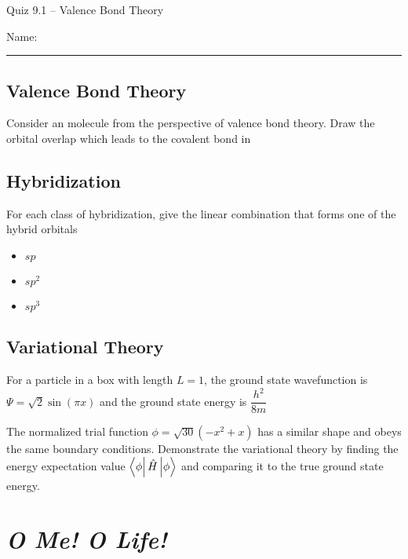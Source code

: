 \documentclass[11pt, letterpaper]{memoir}
\begin{document}
\begin{center}
	{\large Quiz 9.1 -- Valence Bond Theory}
\end{center}
{\large Name: \rule[-1mm]{4in}{.1pt}

\subsection*{Valence Bond Theory}
Consider an  molecule from the perspective of valence bond theory. Draw the orbital overlap which leads to the covalent bond in 

\vspace{4em}
\subsection*{Hybridization}
For each class of hybridization, give the linear combination that forms one of the hybrid orbitals

\begin{itemize}
	\item $sp$

	      \vspace{1em}
	\item $sp^2$

	      \vspace{1em}
	\item $sp^3$
\end{itemize}

\vspace{0.002em}
\subsection*{Variational Theory}
For a particle in a box with length $L=1$, the ground state wavefunction is $\Psi=\sqrt{2}\sin(\pi x)$ and the ground state energy is $\dfrac{h^2}{8m}$

\noindent The normalized trial function $\phi=\sqrt{30}\left(-x^2+x\right)$ has a similar shape and obeys the same boundary conditions. Demonstrate the variational theory by finding the energy expectation value $\matrixel{\phi}{\hat{H}}{\phi}$ and comparing it to the true ground state energy.

\newpage
\pagestyle{empty}
\addtocounter{page}{-1}
\section*{\emph{O Me! O Life!}}
}
\end{document}
